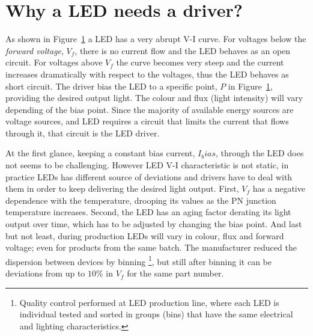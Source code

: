 \section{Why a LED needs a driver?}

As shown in Figure~\ref{fig:led_I-V} a LED has a very abrupt V-I curve. For voltages below the \emph{forward voltage}, $V_{f}$, there is no current flow and the LED behaves as an open circuit. For voltages above $V_{f}$ the curve becomes very steep and the current increases dramatically with respect to the voltages, thus the LED behaves as short circuit. The driver bias the LED to a specific point, $P$ in Figure~\ref{fig:led_I-V}, providing the desired output light. The colour and flux (light intensity) will vary depending of the bias point.  Since the majority of  available  energy sources are  voltage sources, and LED requires a circuit that limits the current that flows through it, that circuit is the LED driver.

\begin{figure}[!h]
\centering
{}
\caption {}
\label{fig:led_I-V}
\end{figure}

At the first glance, keeping a constant bias current, $I_bias$, through the LED does not seems to be challenging. However LED V-I characteristic is not static, in practice LEDs has different source of deviations and drivers have to deal with them in order to keep delivering the desired light output. First, $V_f$ has a negative dependence with the temperature, drooping its values as the PN junction temperature increases. Second, the LED has an aging factor derating its light output over time, which has to be adjusted by changing the bias point. And last but not least, during production LEDs will vary in colour, flux and forward voltage; even for products from the same batch. The manufacturer reduced the dispersion between devices by binning \footnote{Quality control performed at LED production line, where each LED is individual tested and sorted in groups (bins) that have the same electrical and lighting characteristics.}, but still after binning it can be deviations from up to $10\%$ in $V_f$ for the same part number.

